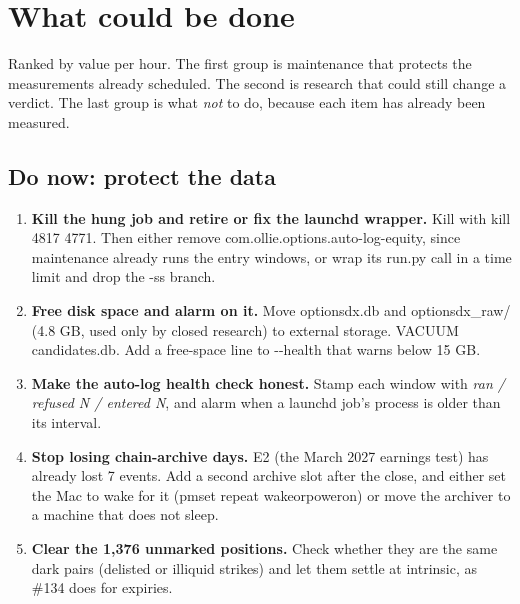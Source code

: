 \documentclass[11pt,a4paper]{article}
\newcommand{\code}[1]{{\ttfamily\small #1}}
\begin{document}
\section{What could be done}\label{sec:next}

Ranked by value per hour. The first group is maintenance that protects the
measurements already scheduled. The second is research that could still change a
verdict. The last group is what \emph{not} to do, because each item has already been measured.

\subsection{Do now: protect the data}
\begin{enumerate}
  \item \textbf{Kill the hung job and retire or fix the launchd wrapper.} Kill with \code{kill 4817 4771}. Then either remove
        \code{com.ollie.options.auto-log-equity}, since maintenance already runs the entry windows, or wrap its
        \code{run.py} call in a time limit and drop the \code{-ss} branch.
  \item \textbf{Free disk space and alarm on it.} Move \code{optionsdx.db} and \code{optionsdx\_raw/}
        (4.8 GB, used only by closed research) to external storage. \code{VACUUM} \code{candidates.db}. Add a
        free-space line to \code{-{}-health} that warns below 15 GB.
  \item \textbf{Make the auto-log health check honest.} Stamp each window with \emph{ran / refused N / entered N}, and alarm when a
        launchd job's process is older than its interval.
  \item \textbf{Stop losing chain-archive days.} E2 (the March 2027 earnings test) has already lost 7 events. Add a
        second archive slot after the close, and either set the Mac to wake for it (\code{pmset repeat wakeorpoweron})
        or move the archiver to a machine that does not sleep.
  \item \textbf{Clear the 1,376 unmarked positions.} Check whether they are the same dark pairs (delisted or illiquid
        strikes) and let them settle at intrinsic, as \#134 does for expiries.
\end{enumerate}
\end{document}
